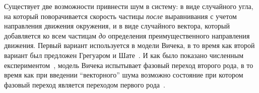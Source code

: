     Существует две возможности привнести шум в систему: в виде случайного угла, на который поворачивается скорость частицы \textit{после} выравнивания с учетом направления движения окружения, и в виде случайного вектора, который добавляется ко всем частицам \textit{до} определения преимущественного направления движения. Первый вариант используется в модели Вичека, в то время как второй вариант был предложен Грегуаром и Шате~\cite{gregoire2004}. И как было показано численным експериментом~\cite{baglietto2008}, модель Вичека испытывает фазовый переход второго рода, в то время как при введении ``векторного'' шума возможно состояние при котором фазовый переход является переходом первого рода~\cite{aldana2009}.
